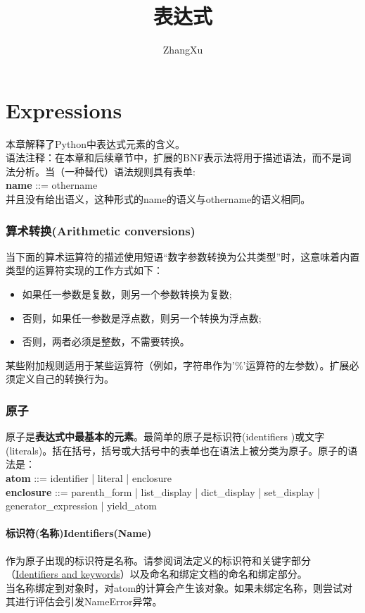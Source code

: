 \documentclass[10pt,UTF8]{ctexart}
\title{表达式}
\author{ZhangXu}
\begin{document}
\maketitle
\part{Expressions}
本章解释了Python中表达式元素的含义。\\
\indent 语法注释：在本章和后续章节中，扩展的BNF表示法将用于描述语法，而不是词法分析。当（一种替代）语法规则具有表单:\\
\textbf{name} ::= othername\\
\indent 并且没有给出语义，这种形式的name的语义与othername的语义相同。
\section{算术转换(Arithmetic conversions)}
当下面的算术运算符的描述使用短语“数字参数转换为公共类型”时，这意味着内置类型的运算符实现的工作方式如下：
\begin{itemize}
\item 如果任一参数是复数，则另一个参数转换为复数;
\item 否则，如果任一参数是浮点数，则另一个转换为浮点数;
\item 否则，两者必须是整数，不需要转换。
\end{itemize}
某些附加规则适用于某些运算符（例如，字符串作为'\%'运算符的左参数）。扩展必须定义自己的转换行为。
\section{原子}
原子是\textbf{表达式中最基本的元素}。最简单的原子是标识符(identifiers )或文字(literals)。括在括号，括号或大括号中的表单也在语法上被分类为原子。原子的语法是：\\
\textbf{atom} ::= identifier | literal | enclosure\\
\textbf{enclosure} ::= parenth_form | list_display | dict_display | set_display | generator_expression | yield_atom
\subsection{标识符(名称)Identifiers(Name)}
作为原子出现的标识符是名称。请参阅词法定义的标识符和关键字部分（\href{https://docs.python.org/3/reference/lexical_analysis.html#identifiers}{Identifiers and keywords}）以及命名和绑定文档的命名和绑定部分。\\
\indent 当名称绑定到对象时，对atom的计算会产生该对象。如果未绑定名称，则尝试对其进行评估会引发NameError异常。
\end{document}
